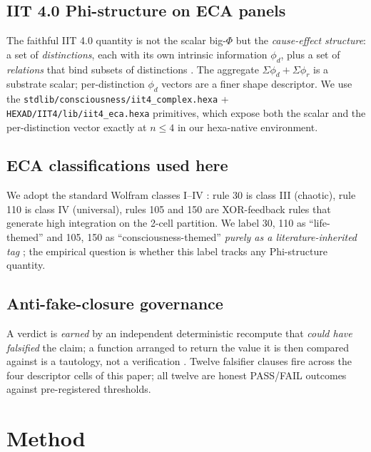 \documentclass[11pt,a4paper]{article}
\begin{document}
\subsection{IIT 4.0 Phi-structure on ECA panels}
The faithful IIT 4.0 quantity is not the scalar big-$\Phi$ but the
\emph{cause-effect structure}: a set of \emph{distinctions}, each with
its own intrinsic information $\phi_d$, plus a set of
\emph{relations} that bind subsets of distinctions
\citep{albantakis2023iit4}. The aggregate $\Sigma \phi_d + \Sigma \phi_r$
is a substrate scalar; per-distinction $\phi_d$ vectors are a finer
shape descriptor. We use the
\texttt{stdlib/consciousness/iit4\_complex.hexa} +
\texttt{HEXAD/IIT4/lib/iit4\_eca.hexa} primitives, which expose both
the scalar and the per-distinction vector exactly at $n \leq 4$
in our hexa-native environment.

\subsection{ECA classifications used here}
We adopt the standard Wolfram classes I--IV
\citep{wolfram1984universality}: rule \textsc{30} is class III
(chaotic), rule \textsc{110} is class IV (universal),
rules \textsc{105} and \textsc{150} are XOR-feedback rules that
generate high integration on the 2-cell partition. We label
\textsc{30}, \textsc{110} as ``life-themed'' and \textsc{105}, \textsc{150}
as ``consciousness-themed'' \emph{purely as a literature-inherited tag}
\citep{anima_H287,anima_H320}; the empirical question is whether this
label tracks any Phi-structure quantity.

\subsection{Anti-fake-closure governance}
A verdict is \emph{earned} by an independent deterministic recompute
that \emph{could have falsified} the claim; a function arranged to
return the value it is then compared against is a tautology, not a
verification \citep{anima_g73}. Twelve falsifier clauses fire
across the four descriptor cells of this paper; all twelve are honest
PASS/FAIL outcomes against pre-registered thresholds.

\section{Method}
\label{sec:method}
\end{document}
